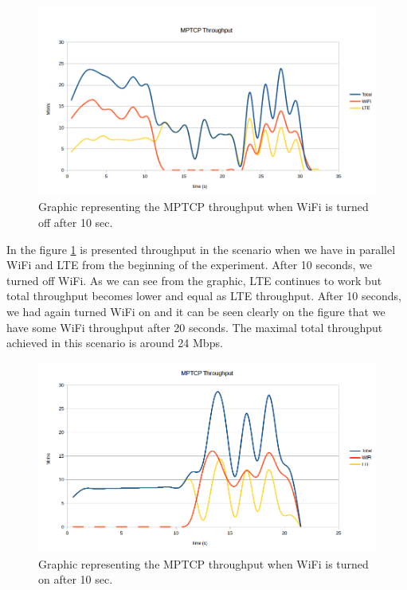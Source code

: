 \documentclass{llncs}
\begin{document}
\begin{figure}[H]
\centering
\includegraphics[width=1.0\textwidth]{result1.png}
\caption{\label{fig:r1} Graphic representing the MPTCP throughput when WiFi is turned off after 10 sec.}
\end{figure}

In the figure \ref{fig:r1} is presented throughput in the scenario when we have in parallel WiFi and LTE from the beginning of the experiment. After 10 seconds, we turned off WiFi. As we can see from the graphic, LTE continues to work but total throughput becomes lower and equal as LTE throughput. After 10 seconds, we had again turned WiFi on and it can be seen clearly on the figure that we have some WiFi throughput after 20 seconds. The maximal total throughput achieved in this scenario is around 24 Mbps.

\begin{figure}[H]
\centering
\includegraphics[width=1.0\textwidth]{result2.png}
\caption{\label{fig:r2} Graphic representing the MPTCP throughput when WiFi is turned on after 10 sec.}
\end{figure}
\end{document}
